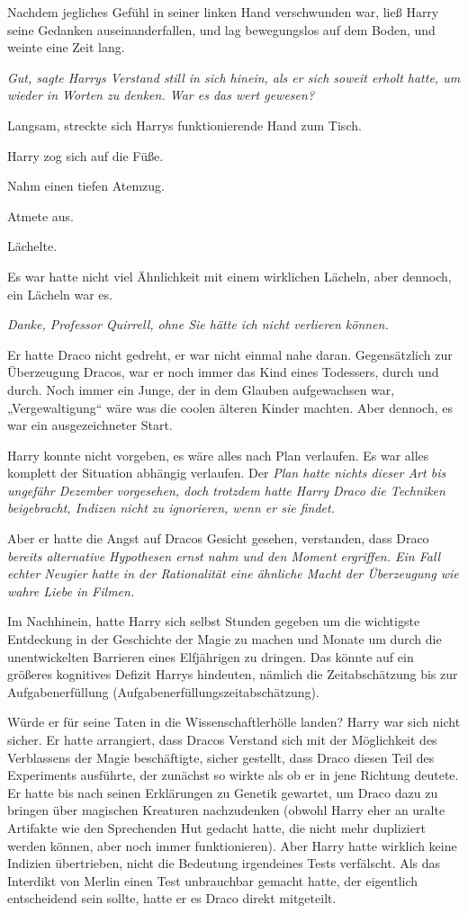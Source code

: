 {Nachdem jegliches Gefühl in seiner linken Hand verschwunden war, ließ Harry seine Gedanken auseinanderfallen, und lag bewegungslos auf dem Boden, und weinte eine Zeit lang.

\emph{Gut, sagte Harrys Verstand still in sich hinein, als er sich soweit erholt hatte, um wieder in Worten zu denken. \emph{War es das wert gewesen?}}

Langsam, streckte sich Harrys funktionierende Hand zum Tisch.

Harry zog sich auf die Füße.

Nahm einen tiefen Atemzug.

Atmete aus.

Lächelte.

Es war hatte nicht viel Ähnlichkeit mit einem wirklichen Lächeln, aber dennoch, ein Lächeln war es.

\emph{Danke, Professor Quirrell, ohne Sie hätte ich nicht verlieren können.}

Er hatte Draco nicht gedreht, er war nicht einmal nahe daran. Gegensätzlich zur Überzeugung Dracos, war er noch immer das Kind eines Todessers, durch und durch. Noch immer ein Junge, der in dem Glauben aufgewachsen war, „Vergewaltigung“ wäre was die coolen älteren Kinder machten. Aber dennoch, es war ein ausgezeichneter Start.

Harry konnte nicht vorgeben, es wäre alles nach Plan verlaufen. Es war alles komplett der Situation abhängig verlaufen. Der \emph{Plan hatte nichts dieser Art bis ungefähr Dezember vorgesehen, doch trotzdem hatte Harry Draco die Techniken beigebracht, Indizen nicht zu ignorieren, wenn er sie findet.}

Aber er hatte die Angst auf Dracos Gesicht gesehen, verstanden, dass Draco \emph{bereits alternative Hypothesen ernst nahm und den Moment ergriffen. Ein Fall echter Neugier hatte in der Rationalität eine ähnliche Macht der Überzeugung wie wahre Liebe in Filmen.}

Im Nachhinein, hatte Harry sich selbst Stunden gegeben um die wichtigste Entdeckung in der Geschichte der Magie zu machen und Monate um durch die unentwickelten Barrieren eines Elfjährigen zu dringen. Das könnte auf ein größeres kognitives Defizit Harrys hindeuten, nämlich die Zeitabschätzung bis zur Aufgabenerfüllung (Aufgabenerfüllungszeitabschätzung).

Würde er für seine Taten in die Wissenschaftlerhölle landen? Harry war sich nicht sicher. Er hatte arrangiert, dass Dracos Verstand sich mit der Möglichkeit des Verblassens der Magie beschäftigte, sicher gestellt, dass Draco diesen Teil des Experiments ausführte, der zunächst so wirkte als ob er in jene Richtung deutete. Er hatte bis nach seinen Erklärungen zu Genetik gewartet, um Draco dazu zu bringen über magischen Kreaturen nachzudenken (obwohl Harry eher an uralte Artifakte wie den Sprechenden Hut gedacht hatte, die nicht mehr dupliziert werden können, aber noch immer funktionieren). Aber Harry hatte wirklich keine Indizien übertrieben, nicht die Bedeutung irgendeines Tests verfälscht. Als das Interdikt von Merlin einen Test unbrauchbar gemacht hatte, der eigentlich entscheidend sein sollte, hatte er es Draco direkt mitgeteilt.

}
